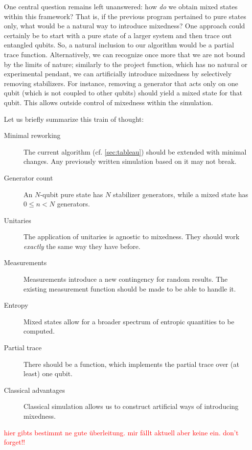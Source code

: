 One central question remains left unanswered: how \emph{do} we obtain mixed
states within this framework?  That is, if the previous program pertained to
pure states only, what would be a natural way to introduce mixedness?  One
approach could certainly be to start with a pure state of a larger system and
then trace out entangled qubits.  So, a natural inclusion to our algorithm
would be a partial trace function.  Alternatively, we can recognize once more
that we are not bound by the limits of nature; similarly to the project
function, which has no natural or experimental pendant, we can artificially
introduce mixedness by selectively removing stabilizers.
For instance, removing a generator that acts only on one qubit (which is not
coupled to other qubits) should yield a mixed state for that qubit. This allows
outside control of mixedness within the simulation.

Let us briefly summarize this train of thought:
\begin{description}
  \item[Minimal reworking] The current algorithm (cf. \cref{sec:tableau})
    should be extended with minimal changes. Any previously written simulation
    based on it may not break.
  \item[Generator count] An $N$-qubit pure state has $N$ stabilizer generators,
    while a mixed state has $0\leq n<N$ generators.
  \item[Unitaries] The application of unitaries is agnostic to mixedness. They
    should work \emph{exactly} the same way they have before.
  \item[Measurements] Measurements introduce a new contingency for random
    results. The existing measurement function should be made to be able to handle it.
  \item[Entropy] Mixed states allow for a broader spectrum of entropic
    quantities to be computed. %
  \item[Partial trace] There should be a function, which implements the partial trace over (at
    least) one qubit.
  \item[Classical advantages] Classical simulation allows us to construct artificial ways of
    introducing mixedness.
\end{description}
\textcolor{red}{hier gibts bestimmt ne gute \"uberleitung. mir f\"allt aktuell
aber keine ein. don't forget!!}

